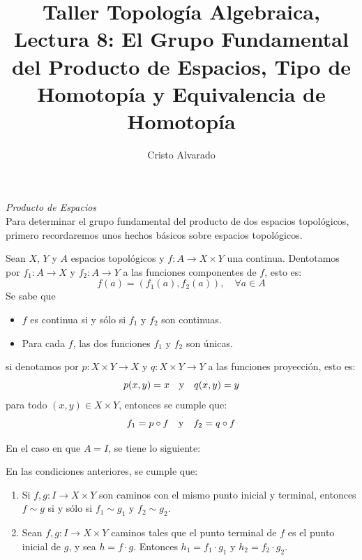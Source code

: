 \documentclass{article}
\newcounter{it}
\theoremstyle{largebreak}
\newcommand\subtitle[1]{\textit{\large #1}\\}
\newcommand\cf[3]{\ensuremath{#1:#2\rightarrow#3}}
\begin{document}
    \title{Taller Topología Algebraica, Lectura 8: El Grupo Fundamental del Producto de Espacios, Tipo de Homotopía y Equivalencia de Homotopía}
    \author{Cristo Alvarado}
    \setcounter{section}{8}
    \maketitle

    \subtitle{Producto de Espacios}

    Para determinar el grupo fundamental del producto de dos espacios topológicos, primero recordaremos unos hechos básicos sobre espacios topológicos.

    Sean $X$, $Y$ y $A$ espacios topológicos y $\cf{f}{A}{X\times Y}$ una  continua. Dentotamos por $\cf{f_1}{A}{X}$ y $\cf{f_2}{A}{Y}$ a las funciones componentes de $f$, esto es:
    \begin{equation*}
        f(a)=(f_1(a),f_2(a)),\quad\forall a\in A
    \end{equation*}
    Se sabe que
    \begin{itemize}
        \item $f$ es continua si y sólo si $f_1$ y $f_2$ son continuas.
        \item Para cada $f$, las dos funciones $f_1$ y $f_2$ son únicas.
    \end{itemize}
    si denotamos por $\cf{p}{X\times Y}{X}$ y $\cf{q}{X\times Y}{Y}$ a las funciones proyección, esto es:
    \begin{equation*}
        p(x,y)=x\quad\textup{y}\quad q(x,y)=y
    \end{equation*}
    para todo $(x,y)\in X\times Y$, entonces se cumple que:
    \begin{equation*}
        f_1=p\circ f\quad\textup{y}\quad f_2=q\circ f
    \end{equation*}

    En el caso en que $A=I$, se tiene lo siguiente:

    \begin{propo}
        En las condiciones anteriores, se cumple que:
        \renewcommand{\theenumi}{\alph{enumi}}
        \begin{enumerate}
            \item Si $\cf{f,g}{I}{X\times Y}$ son caminos con el mismo punto inicial y terminal, entonces $f\sim g$ si y sólo si $f_1\sim g_1$ y $f_2\sim g_2$.
            \item Sean $\cf{f,g}{I}{X\times Y}$ caminos tales que el punto terminal de $f$ es el punto inicial de $g$, y sea $h=f\cdot g$. Entonces $h_1=f_1\cdot g_1$ y $h_2=f_2\cdot g_2$.
        \end{enumerate}
    \end{propo}
\end{document}
